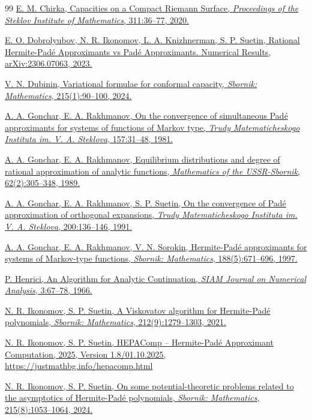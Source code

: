 \documentclass[11pt, a4paper, twoside]{article}
\theoremstyle{plain}
\theoremstyle{definition}
\begin{document}
\begin{thebibliography}{99}
 \href{https://www.mathnet.ru/eng/tm4151}{E. M. Chirka, Capacities on a Compact Riemann Surface, \textit{Proceedings of the Steklov Institute of Mathematics}, 311:36--77, 2020.}

 \href{https://arxiv.org/abs/2306.07063}{E. O. Dobrolyubov, N. R. Ikonomov, L. A. Knizhnerman, S. P. Suetin, Rational Hermite-Padé Approximants vs Padé Approximants. Numerical Results, arXiv:2306.07063, 2023.}

 \href{https://www.mathnet.ru/eng/msb9915}{V. N. Dubinin, Variational formulae for conformal capacity, \textit{Sbornik: Mathematics}, 215(1):90--100, 2024.}

 \href{https://www.mathnet.ru/eng/tm2391}{A. A. Gonchar, E. A. Rakhmanov, On the convergence of simultaneous Padé approximants for systems of functions of Markov type, \textit{Trudy Matematicheskogo Instituta im. V. A. Steklova}, 157:31--48, 1981.}

 \href{https://www.mathnet.ru/eng/msb2759}{A. A. Gonchar, E. A. Rakhmanov, Equilibrium distributions and degree of rational approximation of analytic functions, \textit{Mathematics of the USSR-Sbornik}, 62(2):305--348, 1989.}

 \href{https://www.mathnet.ru/eng/tm1418}{A. A. Gonchar, E. A. Rakhmanov, S. P. Suetin, On the convergence of Padé approximation of orthogonal expansions, \textit{Trudy Matematicheskogo Instituta im. V. A. Steklova}, 200:136--146, 1991.}

 \href{https://www.mathnet.ru/eng/msb225}{A. A. Gonchar, E. A. Rakhmanov, V. N. Sorokin, Hermite-Padé approximants for systems of Markov-type functions, \textit{Sbornik: Mathematics}, 188(5):671--696, 1997.}

 \href{https://doi.org/10.1137/0703005}{P. Henrici, An Algorithm for Analytic Continuation, \textit{SIAM Journal on Numerical Analysis}, 3:67--78, 1966.}

 \href{https://www.mathnet.ru/eng/msb9410}{N. R. Ikonomov, S. P. Suetin, A Viskovatov algorithm for Hermite-Padé polynomials, \textit{Sbornik: Mathematics}, 212(9):1279--1303, 2021.}

 \href{https://justmathbg.info/hepacomp.html}{N. R. Ikonomov, S. P. Suetin, HEPAComp -- Hermite-Padé Approximant Computation, 2025, Version 1.8/01.10.2025, \url{https://justmathbg.info/hepacomp.html}}

 \href{https://www.mathnet.ru/eng/msb10018}{N. R. Ikonomov, S. P. Suetin, On some potential-theoretic problems related to the asymptotics of Hermite-Padé polynomials, \textit{Sbornik: Mathematics}, 215(8):1053--1064, 2024.}


\end{thebibliography}
\end{document}
